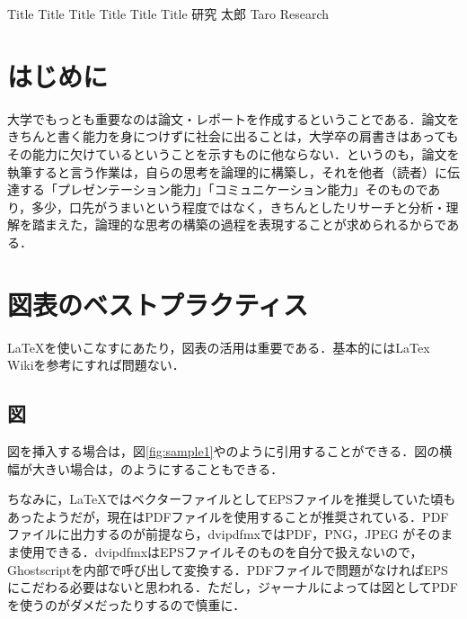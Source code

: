 \documentclass[a4paper,10pt,twocolumn,uplatex]{jsarticle}
\date{1}
\begin{document}
{Title Title Title Title Title Title}
{研究 太郎}
{Taro Research}

\section{はじめに}
大学でもっとも重要なのは論文・レポートを作成するということである．論文をきちんと書く能力を身につけずに社会に出ることは，大学卒の肩書きはあってもその能力に欠けているということを示すものに他ならない．というのも，論文を執筆すると言う作業は，自らの思考を論理的に構築し，それを他者（読者）に伝達する「プレゼンテーション能力」「コミュニケーション能力」そのものであり，多少，口先がうまいという程度ではなく，きちんとしたリサーチと分析・理解を踏まえた，論理的な思考の構築の過程を表現することが求められるからである．

\section{図表のベストプラクティス}
\LaTeX{}を使いこなすにあたり，図表の活用は重要である．基本的にはLaTex Wiki\cite{latex_wiki}を参考にすれば問題ない．\par

\subsection{図}
図を挿入する場合は，図\ref{fig:sample1}やのように引用することができる．図の横幅が大きい場合は，のようにすることもできる．\par
ちなみに，\LaTeX{}ではベクターファイルとしてEPSファイルを推奨していた頃もあったようだが，現在はPDFファイルを使用することが推奨されている．PDFファイルに出力するのが前提なら，dvipdfmxではPDF，PNG，JPEG がそのまま使用できる．dvipdfmxはEPSファイルそのものを自分で扱えないので，Ghostscriptを内部で呼び出して変換する．PDFファイルで問題がなければEPSにこだわる必要はないと思われる．ただし，ジャーナルによっては図としてPDFを使うのがダメだったりするので慎重に．
\end{document}
